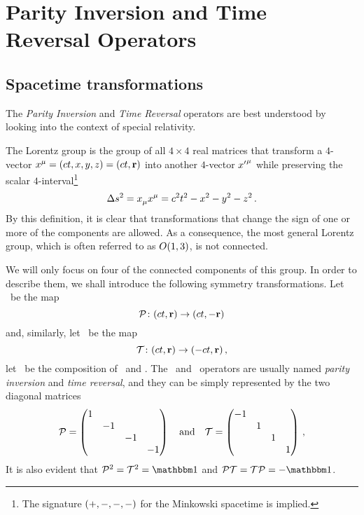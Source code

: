 \chapter{Parity Inversion and Time Reversal Operators}\label{ch:pt-operators}
    \section{Spacetime transformations}
        The \emph{Parity Inversion} and \emph{Time Reversal} operators are best understood by looking into the context of special relativity.

        The Lorentz group is the group of all $4\times4$ real matrices that transform a $4$-vector $\tensor{x}{^\mu} = \pqty{ct,x,y,z} = \pqty{ct,\vb{r}}$ into another $4$-vector $\tensor{{x'}}{^\mu}$ while preserving the scalar $4$-interval\footnote{The signature $\pqty{+,-,-,-}$ for the Minkowski spacetime is implied.}
        \begin{equation}
            \label{eq:4-interval}
            \Delta s^2
            = \tensor{x}{_\mu} \tensor{x}{^\mu}
            = c^2t^2 - x^2 - y^2 - z^2
            \myperiod
        \end{equation}
        By this definition, it is clear that transformations that change the sign of one or more of the components are allowed. As a consequence, the most general Lorentz group, which is often referred to as $O\pqty{1,3}$, is not connected.

        We will only focus on four of the connected components of this group. In order to describe them, we shall introduce the following symmetry transformations. Let \mcP\ be the map 
        \begin{equation}
            \label{eq:lorentz-P}
            \func{\mcP}{\pqty{ct,\vb{r}}}{\pqty{ct,-\vb{r}}}
        \end{equation}
        and, similarly, let \mcT\ be the map
        \begin{equation}
            \label{eq:lorentz-T}
            \func{\mcT}{\pqty{ct,\vb{r}}}{\pqty{-ct,\vb{r}}}
            \mycomma
        \end{equation}
        let \PT\ be the composition of \mcP\ and \mcT.
        The \mcP\ and \mcT\ operators are usually named \emph{parity inversion} and \emph{time reversal}, and they can be simply represented by the two diagonal matrices
        \begin{equation*}
            \mcP = \pmqty{\dmat{1,-1,-1,-1}}
            \qand
            \mcT = \pmqty{\dmat{-1,1,1,1}}
            \mycomma
        \end{equation*}
        It is also evident that $\mcP^2 = \mcT^2 = \idM$ and $\PT = \mcT\mcP = -\idM$.
        

